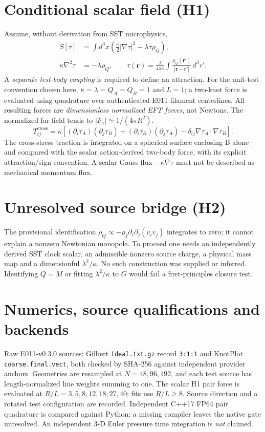 \documentclass[10pt,a4paper]{article}
\begin{document}
\section{Conditional scalar field (H1)}
Assume, without derivation from SST microphysics,
\begin{align}
S[\tau]&=\int d^3x\left(\frac\kappa2|\nabla\tau|^2-\lambda\tau\rho_Q\right),\\
\kappa\nabla^2\tau&=-\lambda\rho_Q,\qquad \tau(\mathbf r)=\frac\lambda{4\pi\kappa}\int\frac{\rho_Q(\mathbf r')}{|\mathbf r-\mathbf r'|}\,d^3r'.
\end{align}
A \emph{separate test-body coupling} is required to define an attraction. For the unit-test convention chosen here, $\kappa=\lambda=Q_A=Q_B=1$ and $L=1$; a two-knot force is evaluated using quadrature over authenticated E011 filament centerlines. All resulting forces are \emph{dimensionless normalized EFT forces}, not Newtons. The normalized far field tends to $|F_z|\simeq1/(4\pi R^2)$.
\begin{equation}
T^{\mathrm{cross}}_{ij}=\kappa\left[(\partial_i\tau_A)(\partial_j\tau_B)+(\partial_i\tau_B)(\partial_j\tau_A)-\delta_{ij}\nabla\tau_A\cdot\nabla\tau_B\right].
\end{equation}
The cross-stress traction is integrated on a spherical surface enclosing B alone and compared with the scalar action-derived two-body force, with its explicit attraction/sign convention. A scalar Gauss flux $-\kappa\nabla\tau$ must not be described as mechanical momentum flux.
\section{Unresolved source bridge (H2)}
The provisional identification $\rho_Q\propto-\rho_f\partial_i\partial_j(v_iv_j)$ integrates to zero; it cannot explain a nonzero Newtonian monopole. To proceed one needs an independently derived SST clock scalar, an admissible nonzero source charge, a physical mass map and a dimensionful $\lambda^2/\kappa$. No such construction was supplied or inferred. Identifying $Q=M$ or fitting $\lambda^2/\kappa$ to $G$ would fail a first-principles closure test.
\section{Numerics, source qualifications and backends}
Raw E011-v0.3.0 sources: Gilbert \texttt{Ideal.txt.gz} record \texttt{3:1:1} and KnotPlot \texttt{coarse.final.vect}, both checked by SHA-256 against independent provider anchors. Geometries are resampled at $N=48,96,192$, and each test source has length-normalized line weights summing to one. The scalar H1 pair force is evaluated at $R/L=3,5,8,12,18,27,40$; fits use $R/L\ge 8$. Source direction and a rotated test configuration are recorded. Independent C++17 FP64 pair quadrature is compared against Python; a missing compiler leaves the native gate unresolved. An independent 3-D Euler pressure time integration is \emph{not} claimed.
\end{document}
